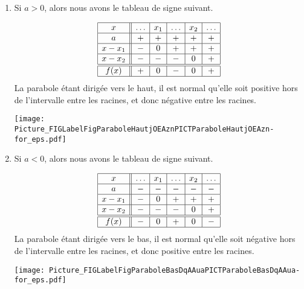 \begin{enumerate}
    \item
        Si \( a>0\), alors nous avons le tableau de signe suivant.
        \begin{multicols}{2}
            \begin{equation*}
                \begin{array}[h]{|c||c|c|c|c|c|}
                    \hline
                    x&\ldots&x_1&\ldots&x_2&\ldots\\
                    \hline
                    a&+&+&+&+&+\\
                    \hline
                    x-x_1&-&0&+&+&+\\
                    \hline
                    x-x_2&-&-&-&0&+\\
                    \hline\hline
                    f(x)&+&0&-&0&+\\
                    \hline
                \end{array}
            \end{equation*}
            La parabole étant dirigée vers le haut, il est normal qu'elle soit positive hors de l'intervalle entre les racines, et donc négative entre les racines.

            \columnbreak

\texttt{[image: Picture\_FIGLabelFigParaboleHautjOEAznPICTParaboleHautjOEAzn-for\_eps.pdf]}

        \end{multicols}
    \item
        Si \( a<0\), alors nous avons le tableau de signe suivant.
        \begin{multicols}{2}
            \begin{equation*}
                \begin{array}[h]{|c||c|c|c|c|c|}
                    \hline
                    x&\ldots&x_1&\ldots&x_2&\ldots\\
                    \hline
                    a&-&-&-&-&-\\
                    \hline
                    x-x_1&-&0&+&+&+\\
                    \hline
                    x-x_2&-&-&-&0&+\\
                    \hline\hline
                    f(x)&-&0&+&0&-\\
                    \hline
                \end{array}
            \end{equation*}
            La parabole étant dirigée vers le bas, il est normal qu'elle soit négative hors de l'intervalle entre les racines, et donc positive entre les racines.

            \columnbreak

\texttt{[image: Picture\_FIGLabelFigParaboleBasDqAAuaPICTParaboleBasDqAAua-for\_eps.pdf]}
        \end{multicols}

\end{enumerate}

